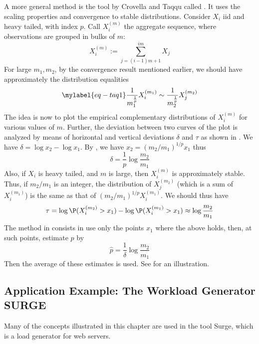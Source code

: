 A more general method is the tool by Crovella and
Taqqu called 
\cite{crovella1999estimating}. It uses the
scaling properties and convergence to stable
distributions. Consider $X_i$ iid and heavy
tailed, with index $p$. Call $X_i^{(m)}$ the
aggregate sequence, where observations are
grouped in bulks of
$m$:
$$X_i^{(m)}:=\sum_{j=(i-1)m + 1}^{im} X_j$$
For large $m_1, m_2$, by the convergence result
mentioned earlier, we should have approximately
the distribution equalities
%
\begin{equation}\mylabel{eq-taq1}
  \frac{1}{m_1^{\frac{1}{p}}}X_i^{(m_1)} \sim \frac{1}{m_2^{\frac{1}{p}}}X_j^{(m_2)}
\end{equation}
The idea is now to plot the empirical
complementary distributions of $X_i^{(m)}$ for
various values of $m$. Further, the deviation
between two curves of the plot is analyzed by
means of horizontal and vertical deviations
$\delta$ and $\tau$ as shown in
 . We have $\delta= \log x_2 - \log x_1$.
  By , we have $x_2=(m_2/m_1)^{1/p}x_1$ thus
  $$
  \delta = \frac{1}{p}\log\frac{m_2}{m_1}
  $$
  Also, if $X_i$ is heavy tailed, and $m$ is large, then
  $X_i^{(m)}$ is approximately stable. Thus, if $m_2/m_1$
  is an integer, the distribution of $X_j^{(m_2)}$ (which
  is a sum of $X_i^{(m_1)}$) is the same as that of
  $(m_2/m_1)^{1/p} X_i^{(m_1)}$. We should thus have
  $$
  \tau = \log \P(X_i^{(m_2)}>x_1) - \log \P(X_i^{(m_1)}>x_1) \approx \log \frac{m_2}{m_1}
  $$
  The method in  consists in use only the
  points $x_1$ where the above holds, then, at such points,
  estimate $p$ by
  $$
  \hat{p}=\frac{1}{\delta} \log \frac{m_2}{m_1}
  $$
  Then the average of these estimates is used. See
 for an illustration.
\begin{figure}[htbp]
\end{figure}

\subsection{Application Example: The Workload Generator
SURGE}\label{sec-modfit-surge-1} Many of the
concepts illustrated in this chapter are used in the tool
Surge\cite{surge-98}, which is a load generator for web
servers.

